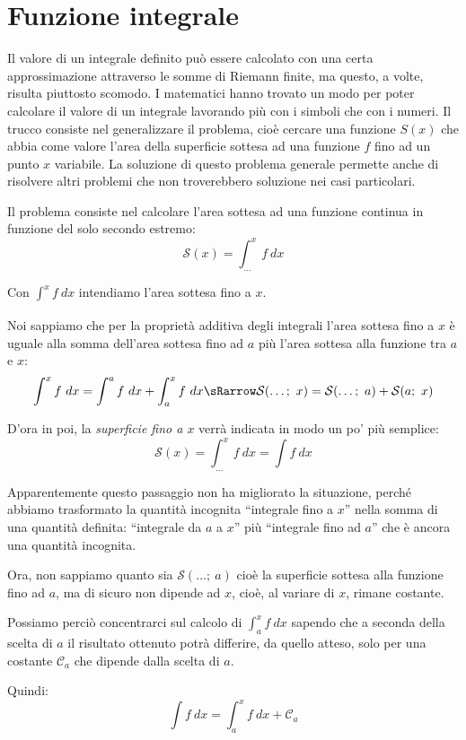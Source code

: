 \section{Funzione integrale}
\label{sec:integrali_funzione_integrale}

Il valore di un integrale definito può essere calcolato con una certa 
approssimazione attraverso le somme di Riemann finite, ma questo, a volte, 
risulta piuttosto scomodo. I matematici hanno trovato un modo per poter 
calcolare il valore di un integrale lavorando più con i simboli che con i 
numeri. Il trucco consiste nel generalizzare il problema, cioè cercare una 
funzione \(S(x)\) che abbia come valore l'area della superficie sottesa ad 
una funzione \(f\) fino ad un punto \(x\) variabile. La soluzione di questo 
problema generale permette anche di risolvere altri problemi che non 
troverebbero soluzione nei casi particolari.

Il problema consiste nel calcolare l'area sottesa ad una funzione continua in 
funzione del solo secondo estremo:
\[\mathcal{S}(x) = \int_{\dots}^x f~dx \] %

Con \(\int_{}^x f~dx\) intendiamo l'area sottesa fino a \(x\).

Noi sappiamo che per la proprietà additiva degli integrali l'area sottesa 
fino a \(x\) è uguale alla somma dell'area sottesa fino ad \(a\) più l'area 
sottesa alla funzione tra \(a\) e \(x\):
\[\int_{}^x f~dx = \int_{}^a f~dx + \int_{a}^x f~dx \sRarrow
  \mathcal{S}(\dots ;~x) = \mathcal{S}(\dots ;~a) + \mathcal{S}(a;~x)\]

D'ora in poi, la \emph{superficie fino a \(x\)} verrà indicata in modo un po' 
più semplice:
\[\mathcal{S}(x) = \int_{\dots}^x f~dx = \int f~dx\]

Apparentemente questo passaggio non ha migliorato la situazione, perché 
abbiamo trasformato la quantità incognita ``integrale fino a \(x\)'' nella 
somma di una quantità definita: ``integrale da \(a\) a \(x\)'' più 
``integrale fino ad \(a\)'' che è ancora una quantità incognita.

\begin{minipage}{.49 \textwidth} 
Ora, non sappiamo quanto sia \(\mathcal{S}(\dots ;~a)\) cioè la superficie 
sottesa alla funzione fino ad \(a\), ma di sicuro non dipende ad \(x\), cioè, 
al variare di \(x\), rimane costante.

Possiamo perciò concentrarci sul calcolo di \(\int_{a}^x f~dx\) sapendo che a 
seconda della scelta di \(a\) il risultato ottenuto potrà differire, da 
quello atteso, solo per una costante \(\mathcal{C}_a\)
che dipende dalla scelta di \(a\).

Quindi:
\[\int f~dx = \int_{a}^x f~dx + \mathcal{C}_a\]
\end{minipage}
\hfill
\begin{minipage}{.49 \textwidth}
\begin{inaccessibleblock}[] 
  \begin{center} \intfinox \end{center}
\end{inaccessibleblock}
\end{minipage}


